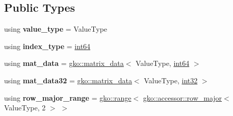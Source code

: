 \subsection*{Public Types}
\begin{DoxyCompactItemize}
\item 
\mbox{\label{classgko_1_1matrix_1_1Dense_aa81a0b3798d10eb503eedd9c7ae658b5}} 
using {\bfseries value\+\_\+type} = Value\+Type
\item 
\mbox{\label{classgko_1_1matrix_1_1Dense_a48f92e035bf16c24ed664915f6648163}} 
using {\bfseries index\+\_\+type} = \hyperlink{namespacegko_a6c57dbf3168b1ecad3ea133aaf2efbc1}{int64}
\item 
\mbox{\label{classgko_1_1matrix_1_1Dense_af3433222c8e30256d79f8984238921f4}} 
using {\bfseries mat\+\_\+data} = \hyperlink{structgko_1_1matrix__data}{gko\+::matrix\+\_\+data}$<$ Value\+Type, \hyperlink{namespacegko_a6c57dbf3168b1ecad3ea133aaf2efbc1}{int64} $>$
\item 
\mbox{\label{classgko_1_1matrix_1_1Dense_a61214ecfce8de48207d1e291beb81c61}} 
using {\bfseries mat\+\_\+data32} = \hyperlink{structgko_1_1matrix__data}{gko\+::matrix\+\_\+data}$<$ Value\+Type, \hyperlink{namespacegko_a1ec26caa2379a21a8d0cde611559fff6}{int32} $>$
\item 
\mbox{\label{classgko_1_1matrix_1_1Dense_a67dd271e69cd4ca2942f4cf236fb328e}} 
using {\bfseries row\+\_\+major\+\_\+range} = \hyperlink{classgko_1_1range}{gko\+::range}$<$ \hyperlink{classgko_1_1accessor_1_1row__major}{gko\+::accessor\+::row\+\_\+major}$<$ Value\+Type, 2 $>$ $>$
\end{DoxyCompactItemize}
